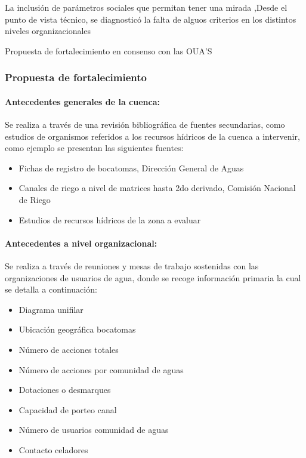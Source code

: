\documentclass[]{article}
\begin{document}
La inclusión de parámetros sociales que permitan tener una mirada ,Desde el punto de vista técnico, se diagnosticó la falta de alguos criterios en los distintos niveles organizacionales

Propuesta de fortalecimiento en consenso con las OUA'S

\subsubsection{Propuesta de fortalecimiento}




\paragraph{Antecedentes generales de la cuenca:}

Se realiza a través de una revisión bibliográfica de fuentes secundarias, como estudios de organismos referidos a los recursos hídricos de la cuenca a intervenir, como ejemplo se presentan las siguientes fuentes:\\

\begin{itemize}
\item Fichas de registro de bocatomas, Dirección General de Aguas
\item Canales de riego a nivel de matrices hasta 2do derivado, Comisión Nacional de Riego
\item Estudios de recursos hídricos de la zona a evaluar
\end{itemize}

\paragraph{Antecedentes a nivel organizacional:}

Se realiza a través de reuniones y mesas de trabajo sostenidas con las organizaciones de usuarios de agua, donde se recoge información primaria la cual se detalla a continuación:\\

\begin{itemize}
\item Diagrama unifilar
\item Ubicación geográfica bocatomas
\item Número de acciones totales
\item Número de acciones por comunidad de aguas
\item Dotaciones o desmarques
\item Capacidad de porteo canal
\item Número de usuarios comunidad de aguas
\item Contacto celadores
\end{itemize}
\end{document}
